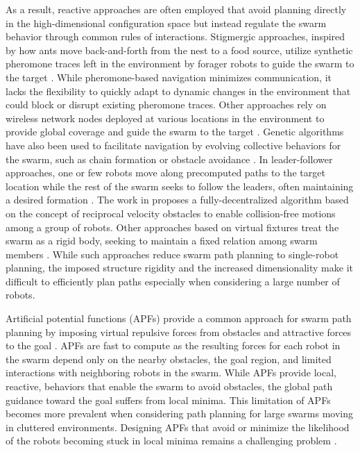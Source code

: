 \documentclass[letterpaper, 10pt, conference]{ieeeconf}
\begin{document}
As a result, reactive approaches are often employed that avoid
planning directly in the high-dimensional configuration space but
instead regulate the swarm behavior through common rules of
interactions. Stigmergic approaches, inspired by how ants move
back-and-forth from the nest to a food source, utilize synthetic
pheromone traces left in the environment by forager robots to guide
the swarm to the target
\cite{swarmPheromone1,swarmPheromone2,swarmPheromone3}.  While
pheromone-based navigation minimizes communication, it lacks the
flexibility to quickly adapt to dynamic changes in the environment
that could block or disrupt existing pheromone traces. Other
approaches rely on wireless network nodes deployed at various
locations in the environment to provide global coverage and guide the
swarm to the target \cite{swarmComm1,swarmComm2}.  Genetic algorithms
have also been used to facilitate navigation by evolving collective
behaviors for the swarm, such as chain formation or obstacle avoidance
\cite{swarmEvolve1,swarmEvolve2}.  In leader-follower approaches, one
or few robots move along precomputed paths to the target location
while the rest of the swarm seeks to follow the leaders, often
maintaining a desired formation
\cite{swarmLeader1,swarmLeader2,swarmLeader3}. The work in
\cite{JurVel} proposes a fully-decentralized algorithm based on
the concept of reciprocal velocity obstacles to enable collision-free
motions among a group of robots. Other approaches based
on virtual fixtures treat the swarm as a rigid body, seeking to
maintain a fixed relation among swarm members
\cite{swarmFixture1,swarmFixture2,swarmFixture3}. While such
approaches reduce swarm path planning to single-robot planning, the
imposed structure rigidity and the increased dimensionality make it
difficult to efficiently plan paths especially when considering a
large number of robots.


Artificial potential functions (APFs) provide a common approach for
swarm path planning by imposing virtual repulsive forces from
obstacles and attractive forces to the goal
\cite{Khatib86,reif1999social,book:SwarmsAPFs,tanner2005formation,swarmPF1,swarmPF2}.
APFs are fast to compute as the resulting forces for each robot in the
swarm depend only on the nearby obstacles, the goal region, and
limited interactions with neighboring robots in the swarm.  While APFs
provide local, reactive, behaviors that enable the swarm to avoid
obstacles, the global path guidance toward the goal suffers from local
minima.  This limitation of APFs becomes more prevalent when
considering path planning for large swarms moving in cluttered
environments. Designing APFs that avoid or minimize the likelihood of
the robots becoming stuck in local minima remains a challenging problem
\cite{RK92}.
\end{document}
